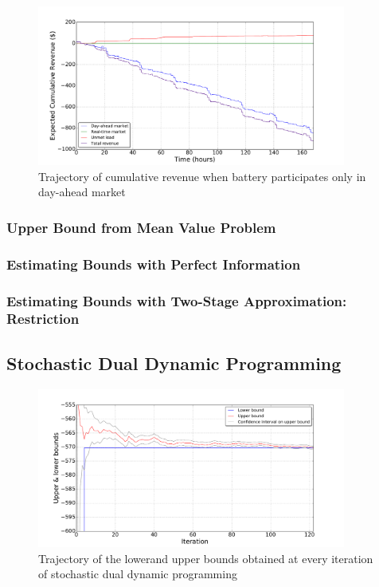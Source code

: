 \documentclass[11pt,twoside]{article}
\begin{document}
\begin{figure}[h!]
\begin{center}
\includegraphics[width=4in]
{Figures/Plots/onlydam/cumulative_rev_fp_st.pdf} \caption{Trajectory of cumulative revenue when battery participates only in day-ahead market}\label{fig:cumulative_rev_onlydam}\end{center}
\end{figure}


\subsubsection{Upper Bound from Mean Value Problem}


\subsubsection{Estimating Bounds with Perfect Information}
\subsubsection{Estimating Bounds with Two-Stage 	Approximation: Restriction}
 
\subsection{Stochastic Dual Dynamic Programming}
\begin{figure}[h!]
\begin{center}
\includegraphics[width=4in]
{Figures/Plots/dualdynamic/bounds.pdf} \caption{Trajectory of the lowerand upper bounds obtained at every iteration of stochastic dual dynamic programming}\label{fig:bounds}\end{center}
\end{figure}
\end{document}
